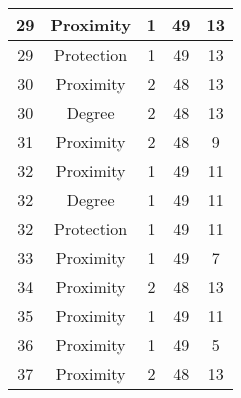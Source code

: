 \documentclass[results.tex]{subfiles}
\begin{document}
\begin{center}
\begin{tabular}{| c || c | c | c | c |}
            \hline
            29                      & Proximity                    & 1                      & 49                      & 13                   \\
            \hline
            29                      & Protection                   & 1                      & 49                      & 13                   \\
            \hline
            30                      & Proximity                    & 2                      & 48                      & 13                   \\
            \hline
            30                      & Degree                       & 2                      & 48                      & 13                   \\
            \hline
            31                      & Proximity                    & 2                      & 48                      & 9                    \\
            \hline
            32                      & Proximity                    & 1                      & 49                      & 11                   \\
            \hline
            32                      & Degree                       & 1                      & 49                      & 11                   \\
            \hline
            32                      & Protection                   & 1                      & 49                      & 11                   \\
            \hline
            33                      & Proximity                    & 1                      & 49                      & 7                    \\
            \hline
            34                      & Proximity                    & 2                      & 48                      & 13                   \\
            \hline
            35                      & Proximity                    & 1                      & 49                      & 11                   \\
            \hline
            36                      & Proximity                    & 1                      & 49                      & 5                    \\
            \hline
            37                      & Proximity                    & 2                      & 48                      & 13                   \\

\end{tabular}
\end{center}
\end{document}
